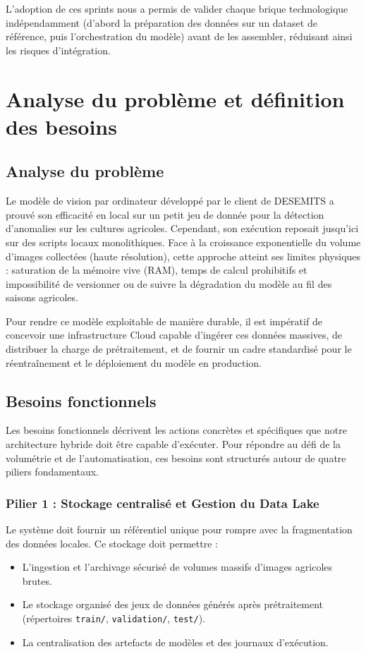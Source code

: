 L'adoption de ces sprints nous a permis de valider chaque brique technologique indépendamment (d'abord la préparation des données sur un dataset de référence, puis l'orchestration du modèle) avant de les assembler, réduisant ainsi les risques d'intégration.

\section{Analyse du problème et définition des besoins}

\subsection{Analyse du problème}
Le modèle de vision par ordinateur développé par le client de DESEMITS a prouvé son efficacité en local sur un petit jeu de donnée pour la détection d'anomalies sur les cultures agricoles. Cependant, son exécution reposait jusqu'ici sur des scripts locaux monolithiques. Face à la croissance exponentielle du volume d'images collectées (haute résolution), cette approche atteint ses limites physiques : saturation de la mémoire vive (RAM), temps de calcul prohibitifs et impossibilité de versionner ou de suivre la dégradation du modèle au fil des saisons agricoles.

Pour rendre ce modèle exploitable de manière durable, il est impératif de concevoir une infrastructure Cloud capable d'ingérer ces données massives, de distribuer la charge de prétraitement, et de fournir un cadre standardisé pour le réentraînement et le déploiement du modèle en production.

\subsection{Besoins fonctionnels}
Les besoins fonctionnels décrivent les actions concrètes et spécifiques que notre architecture hybride doit être capable d'exécuter. Pour répondre au défi de la volumétrie et de l'automatisation, ces besoins sont structurés autour de quatre piliers fondamentaux.

\subsubsection{Pilier 1 : Stockage centralisé et Gestion du Data Lake}
Le système doit fournir un référentiel unique pour rompre avec la fragmentation des données locales. Ce stockage doit permettre :
\begin{itemize}
    \item[$\bullet$] L'ingestion et l'archivage sécurisé de volumes massifs d'images agricoles brutes.
    \item[$\bullet$] Le stockage organisé des jeux de données générés après prétraitement (répertoires \texttt{train/}, \texttt{validation/}, \texttt{test/}).
    \item[$\bullet$] La centralisation des artefacts de modèles et des journaux d'exécution.
\end{itemize}

